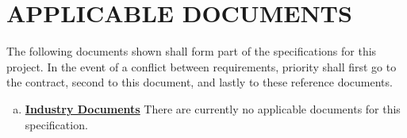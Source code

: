 \section{APPLICABLE DOCUMENTS}
The following documents shown shall form part of the specifications for this project. In the event of a conflict between requirements, priority shall first go to the contract, second to this 
document, and lastly to these reference documents.
\begin{enumerate}[(a)]
  \item \textbf{\underline{Industry Documents}}	
      There are currently no applicable documents for this specification.
\end{enumerate}

